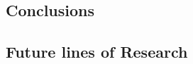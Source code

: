 \documentclass[../main.tex]{subfiles}
\begin{document}
\subsection{Conclusions}


\subsection{Future lines of Research}
\end{document}
